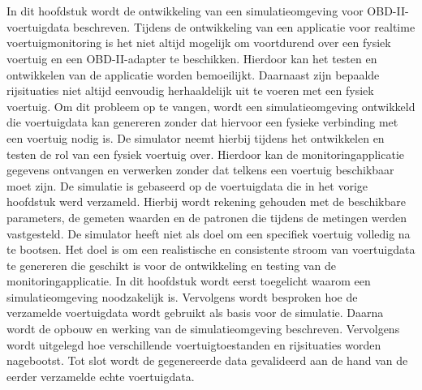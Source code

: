 \chapter{}%
\label{ch:ontwikkeling-van-een-obd-ii-simulatieomgeving}
In dit hoofdstuk wordt de ontwikkeling van een simulatieomgeving voor OBD-II-voertuigdata beschreven. Tijdens de ontwikkeling van een applicatie voor realtime voertuigmonitoring is het niet altijd mogelijk om voortdurend over een fysiek voertuig en een OBD-II-adapter te beschikken. Hierdoor kan het testen en ontwikkelen van de applicatie worden bemoeilijkt. Daarnaast zijn bepaalde rijsituaties niet altijd eenvoudig herhaaldelijk uit te voeren met een fysiek voertuig.
Om dit probleem op te vangen, wordt een simulatieomgeving ontwikkeld die voertuigdata kan genereren zonder dat hiervoor een fysieke verbinding met een voertuig nodig is. De simulator neemt hierbij tijdens het ontwikkelen en testen de rol van een fysiek voertuig over. Hierdoor kan de monitoringapplicatie gegevens ontvangen en verwerken zonder dat telkens een voertuig beschikbaar moet zijn.
De simulatie is gebaseerd op de voertuigdata die in het vorige hoofdstuk werd verzameld. Hierbij wordt rekening gehouden met de beschikbare parameters, de gemeten waarden en de patronen die tijdens de metingen werden vastgesteld. De simulator heeft niet als doel om een specifiek voertuig volledig na te bootsen. Het doel is om een realistische en consistente stroom van voertuigdata te genereren die geschikt is voor de ontwikkeling en testing van de monitoringapplicatie.
In dit hoofdstuk wordt eerst toegelicht waarom een simulatieomgeving noodzakelijk is. Vervolgens wordt besproken hoe de verzamelde voertuigdata wordt gebruikt als basis voor de simulatie. Daarna wordt de opbouw en werking van de simulatieomgeving beschreven. Vervolgens wordt uitgelegd hoe verschillende voertuigtoestanden en rijsituaties worden nagebootst. Tot slot wordt de gegenereerde data gevalideerd aan de hand van de eerder verzamelde echte voertuigdata.

